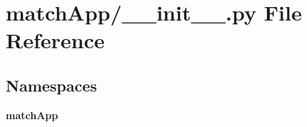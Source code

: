 \section{match\+App/\+\_\+\+\_\+init\+\_\+\+\_\+.py File Reference}
\label{match_app_2____init_____8py}
\subsection*{Namespaces}
\begin{DoxyCompactItemize}
\item 
 {\bf match\+App}
\end{DoxyCompactItemize}
